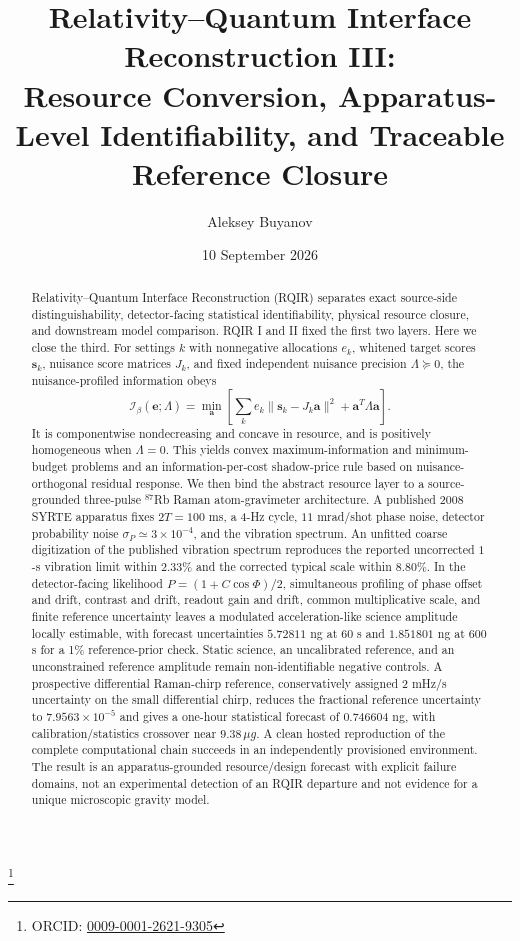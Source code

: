 \documentclass[aps,physrev,reprint,floatfix,superscriptaddress,nofootinbib,longbibliography]{revtex4-2}
\begin{document}
\title{Relativity--Quantum Interface Reconstruction III:\\
Resource Conversion, Apparatus-Level Identifiability, and Traceable Reference Closure}

\author{Aleksey Buyanov}
\thanks{ORCID: \href{https://orcid.org/0009-0001-2621-9305}{0009-0001-2621-9305}}
\date{10 September 2026}

\begin{abstract}
Relativity--Quantum Interface Reconstruction (RQIR) separates exact source-side distinguishability, detector-facing statistical identifiability, physical resource closure, and downstream model comparison. RQIR I and II fixed the first two layers. Here we close the third. For settings $k$ with nonnegative allocations $e_k$, whitened target scores $\bm s_k$, nuisance score matrices $J_k$, and fixed independent nuisance precision $\Lambda\succeq0$, the nuisance-profiled information obeys
\[
\mathcal I_\beta(\bm e;\Lambda)=\min_{\bm a}\left[\sum_k e_k\|\bm s_k-J_k\bm a\|^2+\bm a^T\Lambda\bm a\right].
\]
It is componentwise nondecreasing and concave in resource, and is positively homogeneous when $\Lambda=0$. This yields convex maximum-information and minimum-budget problems and an information-per-cost shadow-price rule based on nuisance-orthogonal residual response. We then bind the abstract resource layer to a source-grounded three-pulse $^{87}$Rb Raman atom-gravimeter architecture. A published 2008 SYRTE apparatus fixes $2T=100$ ms, a 4-Hz cycle, $11$ mrad/shot phase noise, detector probability noise $\sigma_P\simeq3\times10^{-4}$, and the vibration spectrum. An unfitted coarse digitization of the published vibration spectrum reproduces the reported uncorrected $1$-s vibration limit within $2.33\%$ and the corrected typical scale within $8.80\%$. In the detector-facing likelihood $P=(1+C\cos\Phi)/2$, simultaneous profiling of phase offset and drift, contrast and drift, readout gain and drift, common multiplicative scale, and finite reference uncertainty leaves a modulated acceleration-like science amplitude locally estimable, with forecast uncertainties $5.72811$ ng at $60$ s and $1.851801$ ng at $600$ s for a 1\% reference-prior check. Static science, an uncalibrated reference, and an unconstrained reference amplitude remain non-identifiable negative controls. A prospective differential Raman-chirp reference, conservatively assigned $2$ mHz/s uncertainty on the small differential chirp, reduces the fractional reference uncertainty to $7.9563\times10^{-5}$ and gives a one-hour statistical forecast of $0.746604$ ng, with calibration/statistics crossover near $9.38\,\mu g$. A clean hosted reproduction of the complete computational chain succeeds in an independently provisioned environment. The result is an apparatus-grounded resource/design forecast with explicit failure domains, not an experimental detection of an RQIR departure and not evidence for a unique microscopic gravity model.
\end{abstract}

\maketitle







\end{document}
